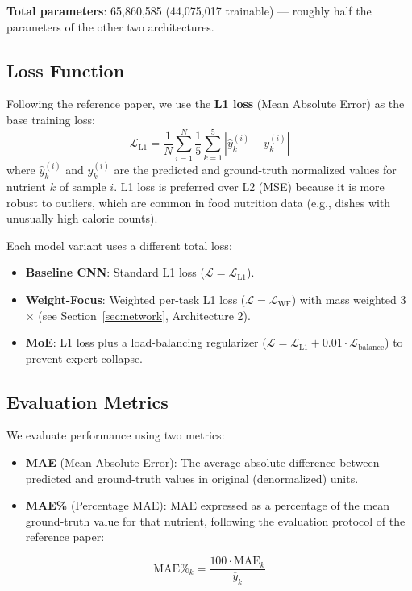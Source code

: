 \documentclass[11pt,a4paper]{article}
\begin{document}
\textbf{Total parameters}: 65,860,585 (44,075,017 trainable) --- roughly half the parameters of the other two architectures.

\subsection{Loss Function}

Following the reference paper, we use the \textbf{L1 loss} (Mean Absolute Error) as the base training loss:
\begin{equation}
  \mathcal{L}_{\text{L1}} = \frac{1}{N} \sum_{i=1}^{N} \frac{1}{5} \sum_{k=1}^{5} \left| \hat{y}_k^{(i)} - y_k^{(i)} \right|
\end{equation}
where $\hat{y}_k^{(i)}$ and $y_k^{(i)}$ are the predicted and ground-truth normalized values for nutrient $k$ of sample $i$. L1 loss is preferred over L2 (MSE) because it is more robust to outliers, which are common in food nutrition data (e.g., dishes with unusually high calorie counts).

Each model variant uses a different total loss:
\begin{itemize}
  \item \textbf{Baseline CNN}: Standard L1 loss ($\mathcal{L} = \mathcal{L}_{\text{L1}}$).
  \item \textbf{Weight-Focus}: Weighted per-task L1 loss ($\mathcal{L} = \mathcal{L}_{\text{WF}}$) with mass weighted 3$\times$ (see Section~\ref{sec:network}, Architecture 2).
  \item \textbf{MoE}: L1 loss plus a load-balancing regularizer ($\mathcal{L} = \mathcal{L}_{\text{L1}} + 0.01 \cdot \mathcal{L}_{\text{balance}}$) to prevent expert collapse.
\end{itemize}

\subsection{Evaluation Metrics}

We evaluate performance using two metrics:
\begin{itemize}
  \item \textbf{MAE} (Mean Absolute Error): The average absolute difference between predicted and ground-truth values in original (denormalized) units.
  \item \textbf{MAE\%} (Percentage MAE): MAE expressed as a percentage of the mean ground-truth value for that nutrient, following the evaluation protocol of the reference paper:
\end{itemize}
\begin{equation}
  \text{MAE\%}_k = \frac{100 \cdot \text{MAE}_k}{\overline{y}_k}
\end{equation}
\end{document}
